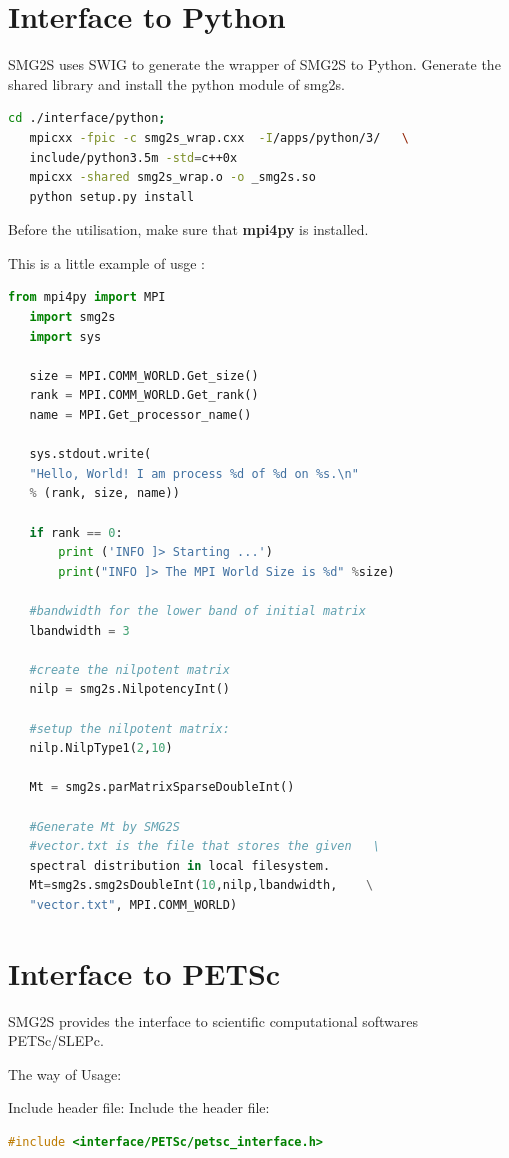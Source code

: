 \documentclass[a4paper, 10 pt]{report}
\begin{document}
	\section{Interface to Python}
	
	SMG2S uses SWIG to generate the wrapper of SMG2S to Python. Generate the shared library and install the python module of smg2s.
	\begin{lstlisting}[language=bash,frame=single]
   cd ./interface/python;
   mpicxx -fpic -c smg2s_wrap.cxx  -I/apps/python/3/   \
   include/python3.5m -std=c++0x
   mpicxx -shared smg2s_wrap.o -o _smg2s.so
   python setup.py install
	\end{lstlisting}
	
	Before the utilisation, make sure that \textbf{mpi4py} is installed.
	
   This is	a little example of usge :
	\begin{lstlisting}[language=Python,frame=single]
   from mpi4py import MPI
   import smg2s
   import sys

   size = MPI.COMM_WORLD.Get_size()
   rank = MPI.COMM_WORLD.Get_rank()
   name = MPI.Get_processor_name()

   sys.stdout.write(
   "Hello, World! I am process %d of %d on %s.\n"
   % (rank, size, name))

   if rank == 0:
       print ('INFO ]> Starting ...')
       print("INFO ]> The MPI World Size is %d" %size)

   #bandwidth for the lower band of initial matrix
   lbandwidth = 3

   #create the nilpotent matrix
   nilp = smg2s.NilpotencyInt()

   #setup the nilpotent matrix:
   nilp.NilpType1(2,10)

   Mt = smg2s.parMatrixSparseDoubleInt()

   #Generate Mt by SMG2S
   #vector.txt is the file that stores the given   \
   spectral distribution in local filesystem.
   Mt=smg2s.smg2sDoubleInt(10,nilp,lbandwidth,    \
   "vector.txt", MPI.COMM_WORLD)
	\end{lstlisting}
	\section{Interface to PETSc}
	
	SMG2S provides the interface to scientific computational softwares PETSc/SLEPc.
	
	The way of Usage:
	
	Include header file:
	Include the header file:
   \begin{lstlisting}[language=C,frame=single]
   #include <interface/PETSc/petsc_interface.h>
   \end{lstlisting}
	
\end{document}

